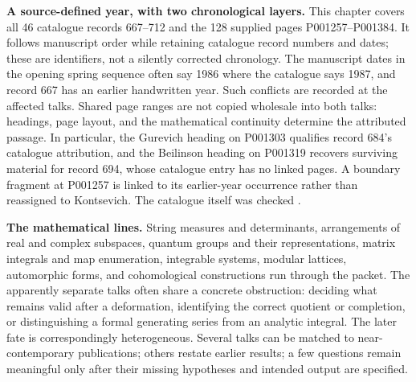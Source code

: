 \noindent\textbf{A source-defined year, with two chronological layers.}
This chapter covers all 46 catalogue records 667--712 and the 128 supplied
pages P001257--P001384. It follows manuscript order while retaining catalogue
record numbers and dates; these are identifiers, not a silently corrected chronology. The manuscript
dates in the opening spring sequence often say 1986 where the catalogue
says 1987, and record 667 has an earlier handwritten year. Such conflicts
are recorded at the affected talks. Shared page ranges are not copied
wholesale into both talks: headings, page layout, and the mathematical
continuity determine the attributed passage. In particular, the Gurevich
heading on P001303 qualifies record 684's catalogue attribution, and the
Beilinson heading on P001319 recovers surviving material for record 694,
whose catalogue entry has no linked pages. A boundary fragment at P001257
is linked to its earlier-year occurrence rather than reassigned to
Kontsevich. The catalogue itself was checked
\citep{mccme2026gelfandcatalogue}.

\medskip
\noindent\textbf{The mathematical lines.}
String measures and determinants, arrangements of real and complex
subspaces, quantum groups and their representations, matrix integrals
and map enumeration, integrable systems, modular lattices, automorphic
forms, and cohomological constructions run through the packet. The
apparently separate talks often share a concrete obstruction: deciding
what remains valid after a deformation, identifying the correct quotient
or completion, or distinguishing a formal generating series from an
analytic integral. The later fate is correspondingly heterogeneous.
Several talks can be matched to near-contemporary publications; others
restate earlier results; a few questions remain meaningful only after
their missing hypotheses and intended output are specified.

